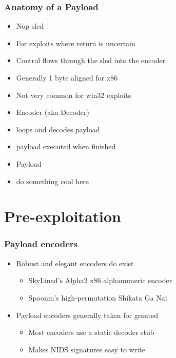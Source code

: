 \documentclass{beamer}
\newenvironment{sitemize}{\vspace{1mm}\begin{itemize}\itemsep 4pt\small}{\end{itemize}}
\begin{document}
\begin{frame}[t]
  \frametitle{Anatomy of a Payload}
  \begin{sitemize}
    \item Nop sled
      \item For exploits where return is uncertain
      \item Control flows through the sled into the encoder
      \item Generally 1 byte aligned for x86
      \item Not very common for win32 exploits
    \item Encoder (aka Decoder)
      \item loops and decodes payload
      \item payload executed when finished
    \item Payload
      \item do something cool here
  \end{sitemize}
\end{frame}


\section{Pre-exploitation}
\begin{frame}[t]
    \frametitle{Payload encoders}

    \begin{sitemize}
        \item Robust and elegant encoders do exist
        \begin{sitemize}
            \item SkyLined's Alpha2 x86 alphanumeric encoder
            \item Spoonm's high-permutation Shikata Ga Nai
        \end{sitemize}

        \pause
        \item Payload encoders generally taken for granted
        \begin{sitemize}
            \item Most encoders use a static decoder stub
            \item Makes NIDS signatures easy to write
        \end{sitemize}
    \end{sitemize}
\end{frame}
\end{document}
